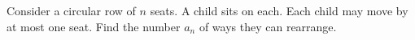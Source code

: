 Consider a circular row of $n$ seats. A child sits on each. Each child may move by at most one seat. Find the number $a_n$ of ways they can rearrange.
